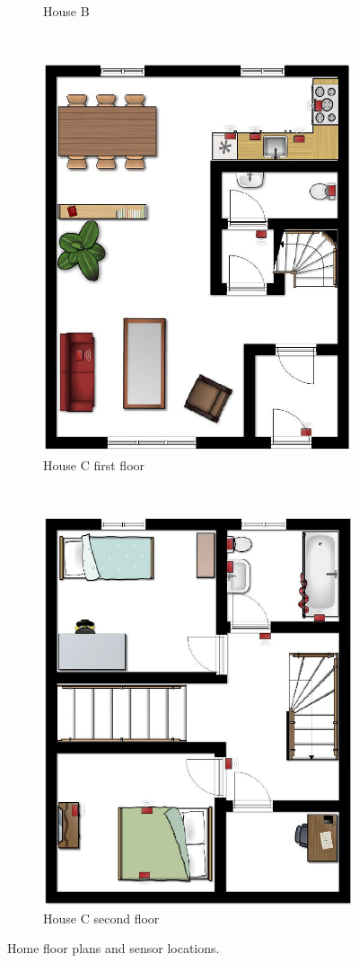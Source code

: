 \begin{figure}
\begin{subfigure}[b]{0.35\textwidth}
		\caption{House B}
		\label{fig:houseB}
	\end{subfigure}
	\\
	\begin{subfigure}[b]{0.35\textwidth}
		\includegraphics[height=\textwidth,angle=90]{fig/houseC1.png}
		\caption{House C first floor}
		\label{fig:houseC1}
	\end{subfigure}
	~
	\begin{subfigure}[b]{0.35\textwidth}
		\includegraphics[height=\textwidth,angle=90]{fig/houseC2.png}
		\caption{House C second floor}
		\label{fig:houseC2}
	\end{subfigure}
	\caption{Home floor plans and sensor locations.}\label{fig:houses}
\end{figure}

